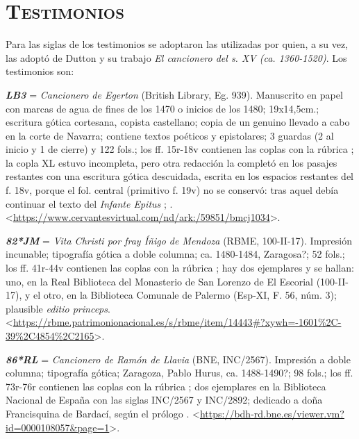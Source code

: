 \documentclass[11pt,twoside]{article}
\newcommand{\eg}{{\emph{\textbf{LB3}}}}
\newcommand{\jm}{\emph{\textbf{82*JM}}}
\newcommand{\rl}{\emph{\textbf{86*RL}}}
\begin{document}
\section*{\centering\textsc{Testimonios}}
%
\noindent Para las siglas de los testimonios se adoptaron las utilizadas por \textcite{PérezPriego2017} quien, a su vez, 
las adoptó de Dutton y su trabajo \emph{El cancionero del s. XV (ca. 1360-1520)}. Los testimonios son:\par
%
{\eg} = \emph{Cancionero de Egerton} (British Library, Eg. 939).
%
Manuscrito en papel con marcas de agua de fines de los 1470 o inicios de los 1480; 19x14,5cm.; escritura gótica cortesana, copista castellano; copia de un genuino llevado a cabo en la corte de Navarra; contiene textos poéticos y epistolares; 3 guardas (2 al inicio y 1 de cierre) y 122 fols.; los ff. 15r-18v contienen las coplas con la rúbrica ; la copla XL estuvo incompleta, pero otra redacción la completó en los pasajes restantes con una escritura gótica descuidada, escrita en los espacios restantes del f. 18v, porque el fol. central (primitivo f. 19v) no se conservó: tras aquel debía continuar el texto del \emph{Infante Epitus} \parencite{Beltrán2011};  \parencite{Severin2000}. <\url{https://www.cervantesvirtual.com/nd/ark:/59851/bmcj1034}>.\par
%
{\jm} = \emph{Vita Christi por fray Íñigo de Mendoza} (RBME, 100-II-17).
%
Impresión incunable; tipografía gótica a doble columna; ca. 1480-1484, Zaragosa?; 52 fols.; los ff. 41r-44v contienen las coplas con la rúbrica ; hay dos ejemplares y se hallan: uno, en la Real Biblioteca del Monasterio de San Lorenzo de El Escorial (100-II-17), y el otro, en la Biblioteca Comunale de Palermo (Esp-XI, F. 56, núm. 3); plausible \emph{editio princeps}. <\url{https://rbme.patrimonionacional.es/s/rbme/item/14443#?xywh=-1601\%2C-39\%2C4854\%2C2165}>.\par
%
{\rl} = \emph{Cancionero de Ramón de Llavia} (BNE, INC/2567).
%
Impresión a doble columna; tipografía gótica; Zaragoza, Pablo Hurus, ca. 1488-1490?; 98 fols.; los ff. 73r-76r contienen las coplas con la rúbrica ; dos ejemplares en la Biblioteca Nacional de España con las siglas INC/2567 y INC/2892; dedicado a doña Francisquina de Bardací, según el prólogo . <\url{https://bdh-rd.bne.es/viewer.vm?id=0000108057\&page=1}>.\par
\end{document}

